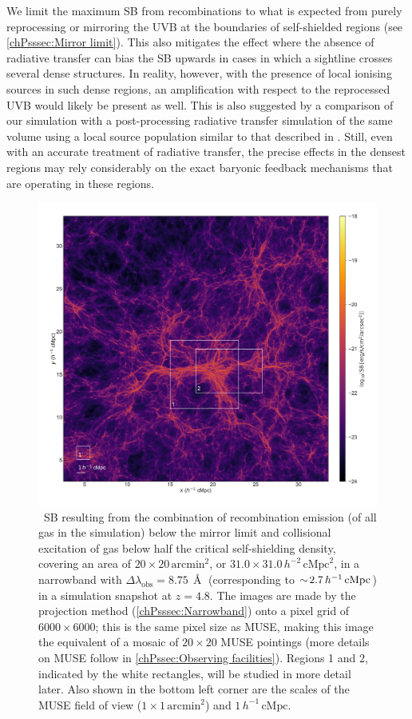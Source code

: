 We limit the maximum SB from recombinations to what is expected from purely reprocessing or mirroring the UVB at the boundaries of self-shielded regions (see \cref{chPsssec:Mirror limit}). This also mitigates the effect where the absence of radiative transfer can bias the SB upwards in cases in which a sightline crosses several dense structures. In reality, however, with the presence of local ionising sources in such dense regions, an amplification with respect to the reprocessed UVB would likely be present as well. This is also suggested by a comparison of our simulation with a post-processing radiative transfer simulation of the same volume using a local source population similar to that described in \citet{2019MNRAS.485L..24K}. Still, even with an accurate treatment of radiative transfer, the precise effects in the densest regions may rely considerably on the exact baryonic feedback mechanisms that are operating in these regions.
\begin{figure}
    \centering
    \includegraphics[width=\linewidth]{"Plots/ChapterP/Overview_SB_map"}
    \caption[Total \lya\ surface brightness at $z=4.8$.]
    {\lya\ SB resulting from the combination of recombination emission (of all gas in the simulation) below the mirror limit and collisional excitation of gas below half the critical self-shielding density, covering an area of $20 \times 20 \, \mathrm{arcmin}^2$, or $31.0 \times 31.0 \, h^{-2} \, \mathrm{cMpc}^2$, in a narrowband with $\Delta \lambda_\text{obs} = 8.75 \, \Angstrom$ (corresponding to $\sim \! 2.7 \, h^{-1} \, \mathrm{cMpc}$) in a simulation snapshot at $z=4.8$. The images are made by the projection method (\cref{chPsssec:Narrowband}) onto a pixel grid of $6000 \times 6000$; this is the same pixel size as MUSE, making this image the equivalent of a mosaic of $20 \times 20$ MUSE pointings (more details on MUSE follow in \cref{chPssec:Observing facilities}). Regions 1 and 2, indicated by the white rectangles, will be studied in more detail later. Also shown in the bottom left corner are the scales of the MUSE field of view ($1 \times 1 \, \mathrm{arcmin}^2$) and $1 \, h^{-1} \, \mathrm{cMpc}$.}
    \label{chPfig:SB}
\end{figure}
